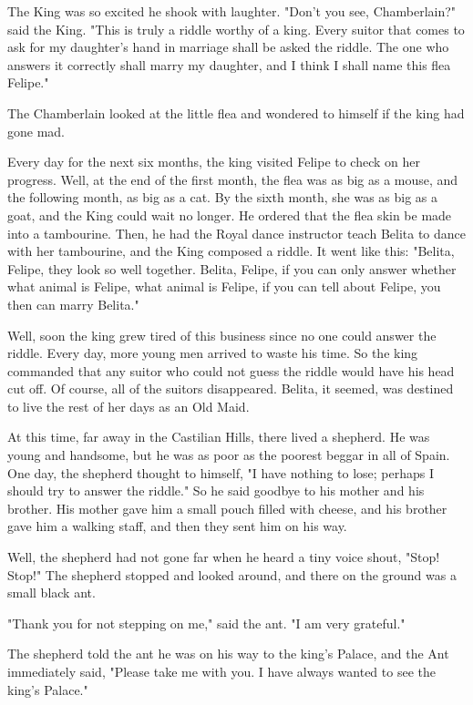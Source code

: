 The King was so excited he shook with laughter. "Don't you see, Chamberlain?" said the King. "This is truly a riddle worthy of a king. Every suitor that comes to ask for my daughter's hand in marriage shall be asked the riddle. The one who answers it correctly shall marry my daughter, and I think I shall name this flea Felipe."

The Chamberlain looked at the little flea and wondered to himself if the king had gone mad.

Every day for the next six months, the king visited Felipe to check on her progress. Well, at the end of the first month, the flea was as big as a mouse, and the following month, as big as a cat. By the sixth month, she was as big as a goat, and the King could wait no longer. He ordered that the flea skin be made into a tambourine. Then, he had the Royal dance instructor teach Belita to dance with her tambourine, and the King composed a riddle. It went like this: "Belita, Felipe, they look so well together. Belita, Felipe, if you can only answer whether what animal is Felipe, what animal is Felipe, if you can tell about Felipe, you then can marry Belita."

Well, soon the king grew tired of this business since no one could answer the riddle. Every day, more young men arrived to waste his time. So the king commanded that any suitor who could not guess the riddle would have his head cut off. Of course, all of the suitors disappeared. Belita, it seemed, was destined to live the rest of her days as an Old Maid.

At this time, far away in the Castilian Hills, there lived a shepherd. He was young and handsome, but he was as poor as the poorest beggar in all of Spain. One day, the shepherd thought to himself, "I have nothing to lose; perhaps I should try to answer the riddle." So he said goodbye to his mother and his brother. His mother gave him a small pouch filled with cheese, and his brother gave him a walking staff, and then they sent him on his way.

Well, the shepherd had not gone far when he heard a tiny voice shout, "Stop! Stop!" The shepherd stopped and looked around, and there on the ground was a small black ant.

"Thank you for not stepping on me," said the ant. "I am very grateful."

The shepherd told the ant he was on his way to the king's Palace, and the Ant immediately said, "Please take me with you. I have always wanted to see the king's Palace."

